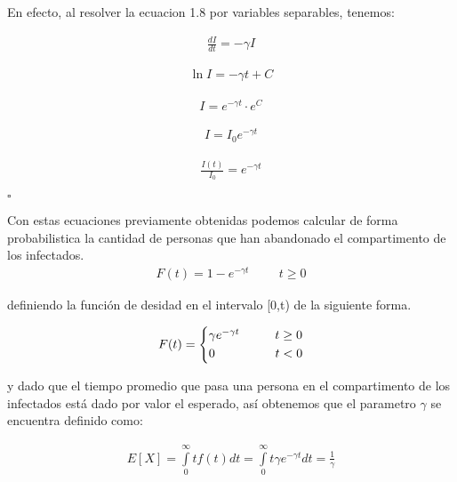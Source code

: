 \begin{Dem}
En efecto, al resolver la ecuacion 1.8 por variables separables, tenemos: 

\begin{align*}
\frac{dI}{dt} = - \gamma I
\end{align*}

\begin{align*}
\ln{I} = - \gamma t + C
\end{align*}

\begin{align*}
I = e^{- \gamma t} \cdot e^{C}
\end{align*}

\begin{align*}
I = I_{0} e^{- \gamma t}
\end{align*}

\begin{align*}
\frac{I(t)}{I_{0}} = e^{-\gamma t}
\end{align*}

\hfill	$\square$

\end{Dem}

Con estas ecuaciones previamente obtenidas podemos calcular de forma probabilistica la cantidad de personas que han abandonado el compartimento de los infectados.
\begin{align}
F(t) = 1 -  e^{-\gamma t} \hspace{1cm} t \geq  0
\end{align}

definiendo la función de desidad en el intervalo [0,t) de la siguiente forma.

\begin{equation*}
F(t) =
\begin{cases*}
\gamma e^{-\gamma t} \hspace{1cm} t \geq  0 \\
0 \hspace{1.7cm} t <  0
\end{cases*}
\end{equation*}

y dado que el tiempo promedio que pasa una persona en el compartimento de los infectados está dado por valor el esperado, así obtenemos que el parametro $\gamma$ se encuentra definido como:

\begin{align}
E[X] = \int \limits_{0}^{\infty} tf(t)dt = \int \limits_{0}^{\infty} t\gamma e^{-\gamma t} dt = \frac{1}{\gamma}
\end{align}

